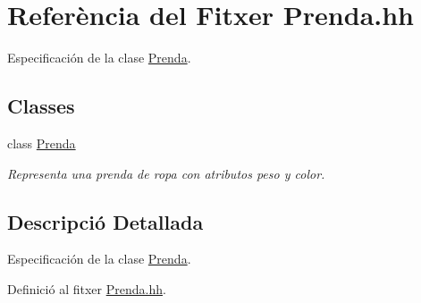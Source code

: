 \hypertarget{_prenda_8hh}{\section{Referència del Fitxer Prenda.\+hh}
\label{_prenda_8hh}
}


Especificación de la clase \hyperlink{class_prenda}{Prenda}.  


\subsection*{Classes}
\begin{DoxyCompactItemize}
\item 
class \hyperlink{class_prenda}{Prenda}
\begin{DoxyCompactList}\small\item\em Representa una prenda de ropa con atributos peso y color. \end{DoxyCompactList}\end{DoxyCompactItemize}


\subsection{Descripció Detallada}
Especificación de la clase \hyperlink{class_prenda}{Prenda}. 



Definició al fitxer \hyperlink{_prenda_8hh_source}{Prenda.\+hh}.

